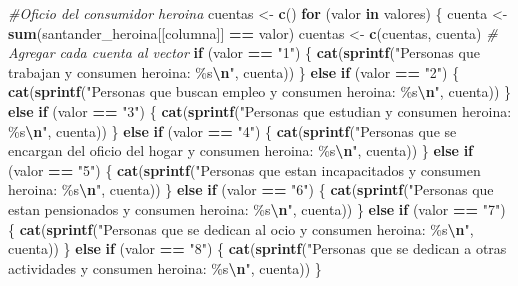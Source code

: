 \documentclass[
]{article}
\newenvironment{Shaded}{\begin{snugshade}}{\end{snugshade}}
\newcommand{\CommentTok}[1]{\textcolor[rgb]{0.56,0.35,0.01}{\textit{#1}}}
\newcommand{\ControlFlowTok}[1]{\textcolor[rgb]{0.13,0.29,0.53}{\textbf{#1}}}
\newcommand{\FunctionTok}[1]{\textcolor[rgb]{0.13,0.29,0.53}{\textbf{#1}}}
\newcommand{\NormalTok}[1]{#1}
\newcommand{\OtherTok}[1]{\textcolor[rgb]{0.56,0.35,0.01}{#1}}
\newcommand{\SpecialCharTok}[1]{\textcolor[rgb]{0.81,0.36,0.00}{\textbf{#1}}}
\newcommand{\StringTok}[1]{\textcolor[rgb]{0.31,0.60,0.02}{#1}}
\begin{document}
\begin{Shaded}
\begin{Highlighting}[]
\CommentTok{\#Oficio del consumidor heroina }
\NormalTok{cuentas }\OtherTok{\textless{}{-}} \FunctionTok{c}\NormalTok{()}
\ControlFlowTok{for}\NormalTok{ (valor }\ControlFlowTok{in}\NormalTok{ valores) \{}
\NormalTok{  cuenta }\OtherTok{\textless{}{-}} \FunctionTok{sum}\NormalTok{(santander\_heroina[[columna]] }\SpecialCharTok{==}\NormalTok{ valor)}
\NormalTok{  cuentas }\OtherTok{\textless{}{-}} \FunctionTok{c}\NormalTok{(cuentas, cuenta)  }\CommentTok{\# Agregar cada cuenta al vector}
  \ControlFlowTok{if}\NormalTok{ (valor }\SpecialCharTok{==} \StringTok{"1"}\NormalTok{) \{}
    \FunctionTok{cat}\NormalTok{(}\FunctionTok{sprintf}\NormalTok{(}\StringTok{"Personas que trabajan y consumen heroina: \%s}\SpecialCharTok{\textbackslash{}n}\StringTok{"}\NormalTok{, cuenta))}
\NormalTok{  \} }\ControlFlowTok{else} \ControlFlowTok{if}\NormalTok{ (valor }\SpecialCharTok{==} \StringTok{"2"}\NormalTok{) \{}
    \FunctionTok{cat}\NormalTok{(}\FunctionTok{sprintf}\NormalTok{(}\StringTok{"Personas que buscan empleo y consumen heroina: \%s}\SpecialCharTok{\textbackslash{}n}\StringTok{"}\NormalTok{, cuenta))}
\NormalTok{  \} }\ControlFlowTok{else} \ControlFlowTok{if}\NormalTok{ (valor }\SpecialCharTok{==} \StringTok{"3"}\NormalTok{) \{}
    \FunctionTok{cat}\NormalTok{(}\FunctionTok{sprintf}\NormalTok{(}\StringTok{"Personas que estudian y consumen heroina: \%s}\SpecialCharTok{\textbackslash{}n}\StringTok{"}\NormalTok{, cuenta))}
\NormalTok{  \} }\ControlFlowTok{else} \ControlFlowTok{if}\NormalTok{ (valor }\SpecialCharTok{==} \StringTok{"4"}\NormalTok{) \{}
    \FunctionTok{cat}\NormalTok{(}\FunctionTok{sprintf}\NormalTok{(}\StringTok{"Personas que se encargan del oficio del hogar y consumen heroina: \%s}\SpecialCharTok{\textbackslash{}n}\StringTok{"}\NormalTok{, cuenta))}
\NormalTok{  \} }\ControlFlowTok{else} \ControlFlowTok{if}\NormalTok{ (valor }\SpecialCharTok{==} \StringTok{"5"}\NormalTok{) \{}
    \FunctionTok{cat}\NormalTok{(}\FunctionTok{sprintf}\NormalTok{(}\StringTok{"Personas que estan incapacitados y consumen heroina: \%s}\SpecialCharTok{\textbackslash{}n}\StringTok{"}\NormalTok{, cuenta))}
\NormalTok{  \} }\ControlFlowTok{else} \ControlFlowTok{if}\NormalTok{ (valor }\SpecialCharTok{==} \StringTok{"6"}\NormalTok{) \{}
    \FunctionTok{cat}\NormalTok{(}\FunctionTok{sprintf}\NormalTok{(}\StringTok{"Personas que estan pensionados y consumen heroina: \%s}\SpecialCharTok{\textbackslash{}n}\StringTok{"}\NormalTok{, cuenta))}
\NormalTok{  \} }\ControlFlowTok{else} \ControlFlowTok{if}\NormalTok{ (valor }\SpecialCharTok{==} \StringTok{"7"}\NormalTok{) \{}
    \FunctionTok{cat}\NormalTok{(}\FunctionTok{sprintf}\NormalTok{(}\StringTok{"Personas que se dedican al ocio y consumen heroina: \%s}\SpecialCharTok{\textbackslash{}n}\StringTok{"}\NormalTok{, cuenta))}
\NormalTok{  \} }\ControlFlowTok{else} \ControlFlowTok{if}\NormalTok{ (valor }\SpecialCharTok{==} \StringTok{"8"}\NormalTok{) \{}
    \FunctionTok{cat}\NormalTok{(}\FunctionTok{sprintf}\NormalTok{(}\StringTok{"Personas que se dedican a otras actividades y consumen heroina: \%s}\SpecialCharTok{\textbackslash{}n}\StringTok{"}\NormalTok{, cuenta))}
\NormalTok{  \}}
  

\end{Highlighting}
\end{Shaded}
\end{document}
